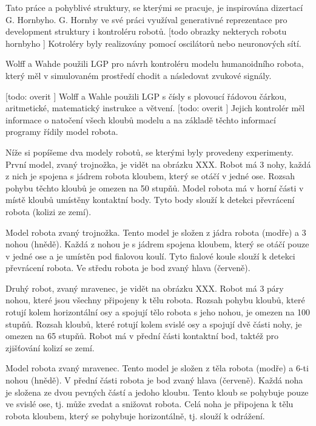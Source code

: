 Tato práce a pohyblivé struktury, se kterými se pracuje, je inspirována dizertací G. Hornbyho.
G. Hornby ve své práci využíval generativné reprezentace pro development struktury i kontroléru robotů.
[todo obrazky nekterych robotu hornbyho ]
Kotroléry byly realizovány pomocí oscilátorů nebo neuronových sítí.

Wolff a Wahde použili LGP pro návrh kontroléru modelu humanoidního robota, který měl v simulovaném prostředí chodit a následovat zvukové signály.

[todo: overit ] Wolff a Wahle použili LGP s čísly s plovoucí řádovou čárkou, aritmetické, matematický instrukce a větvení.
[todo: overit ] Jejich kontrolér měl informace o natočení všech kloubů modelu a na základě těchto informací programy řídily model robota.




Níže si popíšeme dva modely robotů, se kterými byly provedeny experimenty.
První model, zvaný trojnožka, je vidět na obrázku XXX.
Robot má 3 nohy, každá z nich je spojena s jádrem robota kloubem, který se otáčí v jedné ose.
Rozsah pohybu těchto kloubů je omezen na 50 stupňů.
Model robota má v horní části v místě kloubů umístěny kontaktní body.
Tyto body slouží k detekci převrácení robota (kolizi ze zemí).

Model robota zvaný trojnožka.
Tento model je složen z jádra robota (modře) a 3 nohou (hnědě).
Každá z nohou je s jádrem spojena kloubem, který se otáčí pouze v jedné ose a je umístěn pod fialovou koulí.
Tyto fialové koule slouží k detekci převrácení robota.
Ve středu robota je bod zvaný hlava (červeně).

Druhý robot, zvaný mravenec, je vidět na obrázku XXX.
Robot má 3 páry nohou, které jsou všechny připojeny k tělu robota.
Rozsah pohybu kloubů, které rotují kolem horizontální osy a spojují tělo robota s jeho nohou, je omezen na 100 stupňů.
Rozsah kloubů, které rotují kolem svislé osy a spojují dvě části nohy, je omezen na 65 stupňů.
Robot má v přední části kontaktní bod, taktéž pro zjišťování kolizí se zemí.

Model robota zvaný mravenec.
Tento model je složen z těla robota (modře) a 6-ti nohou (hnědě).
V přední části robota je bod zvaný hlava (červeně).
Každá noha je složena ze dvou pevných částí a jedoho kloubu.
Tento kloub se pohybuje pouze ve svislé ose, tj. může zvedat a snižovat robota.
Celá noha je připojena k tělu robota kloubem, který se pohybuje horizontálně, tj. slouží k odrážení.


